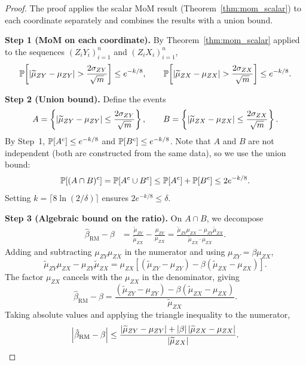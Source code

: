\begin{proof}
The proof applies the scalar MoM result (Theorem~\ref{thm:mom_scalar}) to each coordinate separately and combines the results with a union bound.

\medskip\noindent\textbf{Step 1 (MoM on each coordinate).} By Theorem~\ref{thm:mom_scalar} applied to the sequences $(Z_iY_i)_{i=1}^{n}$ and $(Z_iX_i)_{i=1}^{n}$,
\[
    \operatorname{\mathbb{P}}\!\left[\left|\widetilde{\mu}_{ZY} - \mu_{ZY}\right| > \frac{2\sigma_{ZY}}{\sqrt{m}}\right] \leq e^{-k/8}, \qquad
    \operatorname{\mathbb{P}}\!\left[\left|\widetilde{\mu}_{ZX} - \mu_{ZX}\right| > \frac{2\sigma_{ZX}}{\sqrt{m}}\right] \leq e^{-k/8}.
\]

\medskip\noindent\textbf{Step 2 (Union bound).} Define the events
\[
    A = \left\{\left|\widetilde{\mu}_{ZY} - \mu_{ZY}\right| \leq \frac{2\sigma_{ZY}}{\sqrt{m}}\right\}, \qquad B = \left\{\left|\widetilde{\mu}_{ZX} - \mu_{ZX}\right| \leq \frac{2\sigma_{ZX}}{\sqrt{m}}\right\}.
\]
By Step~1, $\operatorname{\mathbb{P}}[A^c] \leq e^{-k/8}$ and $\operatorname{\mathbb{P}}[B^c] \leq e^{-k/8}$. Note that $A$ and $B$ are not independent (both are constructed from the same data), so we use the union bound:
\[
    \operatorname{\mathbb{P}}[(A \cap B)^c] = \operatorname{\mathbb{P}}[A^c \cup B^c] \leq \operatorname{\mathbb{P}}[A^c] + \operatorname{\mathbb{P}}[B^c] \leq 2e^{-k/8}.
\]
Setting $k = \lceil 8\ln(2/\delta)\rceil$ ensures $2e^{-k/8} \leq \delta$.

\medskip\noindent\textbf{Step 3 (Algebraic bound on the ratio).} On $A \cap B$, we decompose
\begin{align*}
    \hat{\beta}_{\mathrm{RM}} - \beta
    &= \frac{\widetilde{\mu}_{ZY}}{\widetilde{\mu}_{ZX}} - \frac{\mu_{ZY}}{\mu_{ZX}}
    = \frac{\widetilde{\mu}_{ZY}\mu_{ZX} - \mu_{ZY}\widetilde{\mu}_{ZX}}{\widetilde{\mu}_{ZX}\cdot\mu_{ZX}}.
\end{align*}
Adding and subtracting $\mu_{ZY}\mu_{ZX}$ in the numerator and using $\mu_{ZY} = \beta\mu_{ZX}$,
\[
    \widetilde{\mu}_{ZY}\mu_{ZX} - \mu_{ZY}\widetilde{\mu}_{ZX}
    = \mu_{ZX}\!\left[(\widetilde{\mu}_{ZY} - \mu_{ZY}) - \beta(\widetilde{\mu}_{ZX} - \mu_{ZX})\right].
\]
The factor $\mu_{ZX}$ cancels with the $\mu_{ZX}$ in the denominator, giving
\[
    \hat{\beta}_{\mathrm{RM}} - \beta = \frac{(\widetilde{\mu}_{ZY} - \mu_{ZY}) - \beta(\widetilde{\mu}_{ZX} - \mu_{ZX})}{\widetilde{\mu}_{ZX}}.
\]
Taking absolute values and applying the triangle inequality to the numerator,
\[
    \left|\hat{\beta}_{\mathrm{RM}} - \beta\right| \leq \frac{\left|\widetilde{\mu}_{ZY} - \mu_{ZY}\right| + \left|\beta\right|\left|\widetilde{\mu}_{ZX} - \mu_{ZX}\right|}{\left|\widetilde{\mu}_{ZX}\right|}.
\]


\end{proof}

